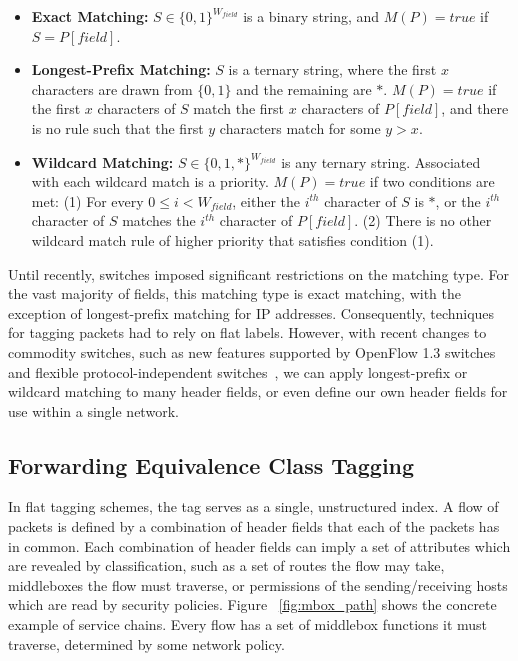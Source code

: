 \begin{itemize}
  \item \textbf{Exact Matching:} $S \in \{0,1\}^{W_{field}}$ is a binary string, and $M(P) = true$ if $S = P[field]$.\\
  \item \textbf{Longest-Prefix Matching:} $S$ is a ternary string, where the first $x$ characters are drawn from $\{0,1\}$ and the remaining are $*$. $M(P) = true$ if the first $x$ characters of $S$ match the first $x$ characters of $P[field]$, and there is no rule such that the first $y$ characters match for some $y > x$.\\
  \item \textbf{Wildcard Matching:} $S \in \{0,1,*\}^{W_{field}}$ is any ternary string. Associated with each wildcard match is a priority. $M(P) = true$ if two conditions are met: (1) For every $0 \le i < W_{field}$, either the $i^{th}$ character of $S$ is $*$, or the $i^{th}$ character of $S$ matches the $i^{th}$ character of $P[field]$. (2) There is no other wildcard match rule of higher priority that satisfies condition (1).
\end{itemize}
  
Until recently, switches imposed significant restrictions on the matching type.  For the vast majority of fields, this matching type is exact matching, with the exception of longest-prefix matching for IP addresses. Consequently, techniques for tagging packets had to rely on flat labels.  However, with recent changes to commodity switches, such as new features supported by OpenFlow 1.3 switches~\cite{of13} and flexible protocol-independent switches~\cite{P4}, we can apply longest-prefix or wildcard matching to many header fields, or even define our own header fields for use within a single network.

\subsection{Forwarding Equivalence Class Tagging}
In flat tagging schemes, the tag serves as a single, unstructured index.  A flow of packets is defined by a combination of header fields that each of the packets has in common. Each combination of header fields can imply a set of attributes which are revealed by classification, such as a set of routes the flow may take, middleboxes the flow must traverse, or permissions of the sending/receiving hosts which are read by security policies.  Figure ~\ref{fig:mbox_path} shows the concrete example of service chains. Every flow has a set of middlebox functions it must traverse, determined by some network policy.

